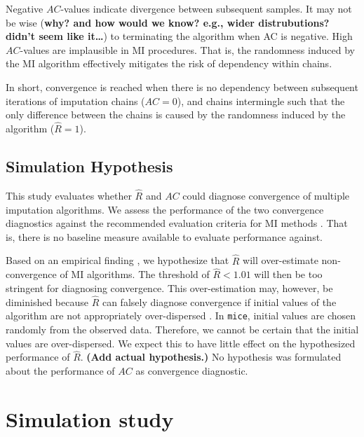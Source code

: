\documentclass[Royal,times,sageh]{sagej}
\begin{document}
Negative \(AC\)-values indicate divergence between subsequent samples.
It may not be wise (\textbf{why? and how would we know? e.g., wider
distrubutions? didn't seem like it\ldots{}}) to terminating the
algorithm when AC is negative. High \(AC\)-values are implausible in MI
procedures. That is, the randomness induced by the MI algorithm
effectively mitigates the risk of dependency within chains.

In short, convergence is reached when there is no dependency between
subsequent iterations of imputation chains (\(AC = 0\)), and chains
intermingle such that the only difference between the chains is caused
by the randomness induced by the algorithm (\(\widehat{R} = 1\)).

\hypertarget{simulation-hypothesis}{%
\subsection{Simulation Hypothesis}\label{simulation-hypothesis}}

This study evaluates whether \(\widehat{R}\) and \(AC\) could diagnose
convergence of multiple imputation algorithms. We assess the performance
of the two convergence diagnostics against the recommended evaluation
criteria for MI methods \citep[i.e., average bias, average confidence
interval width, and empirical coverage rate across simulations;][\(\S\)
2.5.2]{buur18}. That is, there is no baseline measure available to
evaluate performance against.

Based on an empirical finding \citep{lace07}, we hypothesize that
\(\widehat{R}\) will over-estimate non-convergence of MI algorithms. The
threshold of \(\widehat{R} < 1.01\) will then be too stringent for
diagnosing convergence. This over-estimation may, however, be diminished
because \(\widehat{R}\) can falsely diagnose convergence if initial
values of the algorithm are not appropriately over-dispersed
\citep[p.~437]{broo98}. In \texttt{mice}, initial values are chosen
randomly from the observed data. Therefore, we cannot be certain that
the initial values are over-dispersed. We expect this to have little
effect on the hypothesized performance of \(\widehat{R}\). \textbf{(Add
actual hypothesis.)} No hypothesis was formulated about the performance
of \(AC\) as convergence diagnostic.

\hypertarget{simulation-study}{%
\section{Simulation study}\label{simulation-study}}
\end{document}

